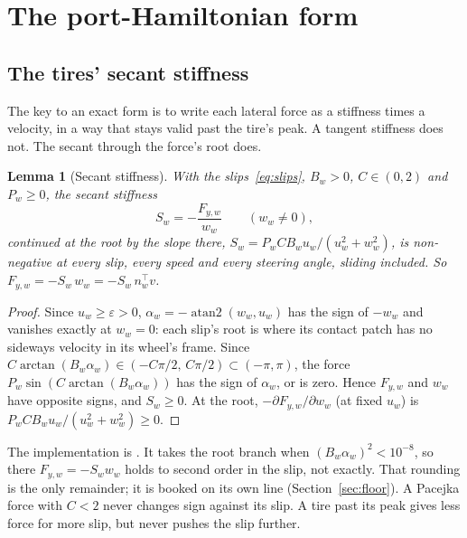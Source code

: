 \documentclass[11pt]{article}
\newtheorem{lemma}{Lemma}
\theoremstyle{remark}
\newcommand{\T}{^{\top}}
\begin{document}
\section{The port-Hamiltonian form}
\label{sec:ph}

\subsection{The tires' secant stiffness}
The key to an exact form is to write each lateral force as a stiffness times a velocity, in a way
that stays valid past the tire's peak. A tangent stiffness does not. The secant through the force's
root does.

\begin{lemma}[Secant stiffness]
\label{lem:secant}
With the slips~\eqref{eq:slips}, $B_w>0$, $C\in(0,2)$ and $P_w\ge0$, the secant stiffness
\begin{equation}
  S_w=-\frac{F_{y,w}}{w_w}\qquad(w_w\neq0),
  \label{eq:secant}
\end{equation}
continued at the root by the slope there, $S_w=P_wCB_wu_w/(u_w^2+w_w^2)$, is non-negative at every
slip, every speed and every steering angle, sliding included. So $F_{y,w}=-S_w\,w_w=-S_w\,n_w\T v$.
\end{lemma}

\begin{proof}
Since $u_w\ge\varepsilon>0$, $\alpha_w=-\operatorname{atan2}(w_w,u_w)$ has the sign of $-w_w$ and
vanishes exactly at $w_w=0$: each slip's root is where its contact patch has no sideways velocity
in its wheel's frame. Since $C\arctan(B_w\alpha_w)\in(-C\pi/2,\,C\pi/2)\subset(-\pi,\pi)$, the
force $P_w\sin(C\arctan(B_w\alpha_w))$ has the sign of $\alpha_w$, or is zero. Hence $F_{y,w}$ and
$w_w$ have opposite signs, and $S_w\ge0$. At the root, $-\partial F_{y,w}/\partial w_w$ (at fixed
$u_w$) is $P_wCB_wu_w/(u_w^2+w_w^2)\ge0$.
\end{proof}

The implementation is . It takes the root branch when
$(B_w\alpha_w)^2<10^{-8}$, so there $F_{y,w}=-S_ww_w$ holds to second order in the slip, not
exactly. That rounding is the only remainder; it is booked on its own line
(Section~\ref{sec:floor}). A Pacejka force with $C<2$ never changes sign against its slip. A tire
past its peak gives less force for more slip, but never pushes the slip further.
\end{document}
